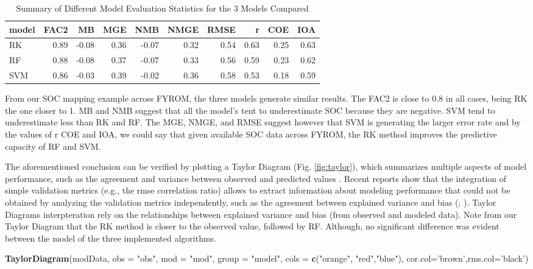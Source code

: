 \documentclass[10pt,b5paper,]{book}
\newenvironment{Shaded}{\begin{snugshade}}{\end{snugshade}}
\newcommand{\DataTypeTok}[1]{\textcolor[rgb]{0.13,0.29,0.53}{#1}}
\newcommand{\KeywordTok}[1]{\textcolor[rgb]{0.13,0.29,0.53}{\textbf{#1}}}
\newcommand{\NormalTok}[1]{#1}
\newcommand{\StringTok}[1]{\textcolor[rgb]{0.31,0.60,0.02}{#1}}
\theoremstyle{definition}
\theoremstyle{definition}
\theoremstyle{definition}
\theoremstyle{remark}
\begin{document}
\begin{table}

\caption{\label{tab:modsts}Summary of Different Model Evaluation Statistics for the 3 Models Compared}
\centering
\begin{tabular}[t]{lrrrrrrrrr}
\toprule
model & FAC2 & MB & MGE & NMB & NMGE & RMSE & r & COE & IOA\\
\midrule
RK & 0.89 & -0.08 & 0.36 & -0.07 & 0.32 & 0.54 & 0.63 & 0.25 & 0.63\\
RF & 0.88 & -0.08 & 0.37 & -0.07 & 0.33 & 0.56 & 0.59 & 0.23 & 0.62\\
SVM & 0.86 & -0.03 & 0.39 & -0.02 & 0.36 & 0.58 & 0.53 & 0.18 & 0.59\\
\bottomrule
\end{tabular}
\end{table}

From our SOC mapping example across FYROM, the three models generate
similar results. The FAC2 is close to 0.8 in all cases, being RK the one
closer to 1. MB and NMB suggest that all the model's tent to
underestimate SOC because they are negative. SVM tend to underestimate
less than RK and RF. The MGE, NMGE, and RMSE suggest however that SVM is
generating the larger error rate and by the values of r COE and IOA, we
could say that given available SOC data across FYROM, the RK method
improves the predictive capacity of RF and SVM.

The aforementioned conclusion can be verified by plotting a Taylor
Diagram (Fig. \ref{fig:taylor}), which summarizes multiple aspects of
model performance, such as the agreement and variance between observed
and predicted values \citep{taylor2001summarizing}. Recent reports show
that the integration of simple validation metrics (e.g., the rmse
correlation ratio) allows to extract information about modeling
performance that could not be obtained by analyzing the validation
metrics independently, such as the agreement between explained variance
and bias (\citet{soil-2017-40}; \citet{nussbaum2018evaluation}). Taylor
Diagrams interpteration rely on the relationships between explained
variance and bias (from observed and modeled data). Note from our Taylor
Diagram that the RK method is closer to the observed value, followed by
RF. Although, no significant difference was evident between the model of
the three implemented algorithms.

\begin{Shaded}
\begin{Highlighting}[]
\KeywordTok{TaylorDiagram}\NormalTok{(modData, }\DataTypeTok{obs =} \StringTok{"obs"}\NormalTok{, }\DataTypeTok{mod =} \StringTok{"mod"}\NormalTok{, }\DataTypeTok{group =} \StringTok{"model"}\NormalTok{,}
\DataTypeTok{cols =} \KeywordTok{c}\NormalTok{(}\StringTok{"orange"}\NormalTok{, }\StringTok{"red"}\NormalTok{,}\StringTok{"blue"}\NormalTok{), }\DataTypeTok{cor.col=}\StringTok{'brown'}\NormalTok{,}\DataTypeTok{rms.col=}\StringTok{'black'}\NormalTok{)}
\end{Highlighting}
\end{Shaded}
\end{document}
